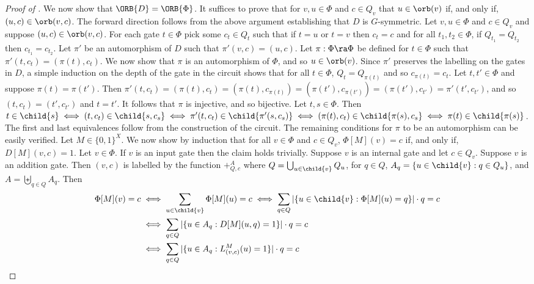 \documentclass{toc}
\begin{document}
\begin{proof}[Proof of ]
  We now show that $\ORB{D} = \ORB{\Phi}$. It suffices to prove that for $v, u
  \in \Phi$ and $c \in Q_v$ that $u \in \orb(v)$ if, and only if, $(u, c) \in
  \orb(v, c)$. The forward direction follows from the above argument
  establishing that $D$ is $G$-symmetric. Let $v, u \in \Phi$ and $c \in Q_v$
  and suppose $(u, c) \in \orb(v, c)$. For each gate $t \in \Phi$ pick some $c_t
  \in Q_t$ such that if $t = u$ or $t = v$ then $c_t = c$ and for all $t_1, t_2
  \in \Phi$, if $Q_{t_1} = Q_{t_2}$ then $c_{t_1} = c_{t_2}$. Let $\pi'$ be an
  automorphism of $D$ such that $\pi'(v, c) = (u, c)$. Let $\pi : \Phi \ra \Phi$
  be defined for $t \in \Phi$ such that $\pi' (t, c_t) = (\pi(t), c_t)$. We now
  show that $\pi$ is an automorphism of $\Phi$, and so $u \in
  \orb(v)$. Since $\pi'$ preserves the labelling on the gates in $D$,
  a simple induction on the depth of the gate in the circuit shows 
  that for all $t \in \Phi$, $Q_{t} = Q_{\pi(t)}$ and so $c_{\pi(t)} = c_t$. Let
  $t, t' \in \Phi$ and suppose $\pi(t) = \pi (t')$. Then $\pi'(t, c_t) =
  (\pi(t), c_t) = (\pi(t), c_{\pi(t)}) = (\pi(t'), c_{\pi(t')}) = (\pi(t'),
  c_{t'}) = \pi'(t', c_{t'})$, and so $(t, c_t) = (t', c_{t'})$ and $t = t'$. It
  follows that $\pi$ is injective, and so bijective. Let $t, s \in \Phi$. Then
  $t \in \child{s} \iff (t, c_t) \in \child{s, c_s} \iff \pi'(t, c_t) \in
  \child{\pi'(s, c_s)} \iff (\pi(t), c_t) \in \child{\pi(s), c_s} \iff \pi(t)
  \in \child{\pi(s)}$. The first and last equivalences follow from the
  construction of the circuit. The remaining conditions for $\pi$ to be an
  automorphism can be easily verified.
  Let $M \in \{0, 1\}^{X}$. We now show by induction that for all $v \in \Phi$
  and $c \in Q_v$, $\Phi[M](v) = c$ if, and only if, $D[M](v, c) = 1$. Let $v
  \in \Phi$. If $v$ is an input gate then the claim holds trivially. Suppose $v$
  is an internal gate and let $c \in Q_v$. Suppose $v$ is an addition gate. Then
  $(v, c)$ is labelled by the function $+^A_{Q, c}$ where $Q = \bigcup_{u \in
    \child{v}} Q_u$, for $q \in Q$, $A_q = \{u \in \child{v} : q \in Q_u\}$, and
  $A = \biguplus_{q \in Q}A_q$. Then
  \begin{align*}
    \Phi[M](v) = c &\iff \sum_{u \in \child{v}} \Phi[M](u) = c 
                     \iff \sum_{q \in Q} \vert \{u \in  \child{v} : \Phi[M](u) = q\}\vert \cdot q = c\\
                   &\iff \sum_{q \in  Q} \vert \{u \in A_q : D[M](u, q) = 1\}\vert \cdot q = c \\
                   &\iff \sum_{q \in Q} \vert \{u \in A_q : L^M_{(v, c)}(u) = 1\} \vert \cdot q = c\\

\end{align*}
\end{proof}
\end{document}
